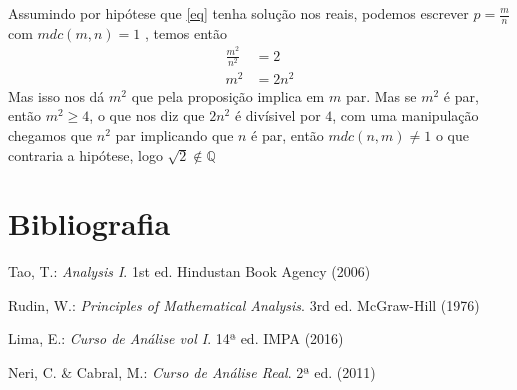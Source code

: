 \documentclass{article}
\newcommand{\QQ}{\mathbb{Q}}
\theoremstyle{plain}
\theoremstyle{remark}
\numberwithin{equation}{section}
\numberwithin{thm}{section}
\numberwithin{defn}{section}
\numberwithin{lemma}{section}
\numberwithin{axm}{section}
\begin{document}
Assumindo por hipótese que \eqref{eq} tenha solução nos reais, podemos escrever \(p = \frac{m}{n}\) com \(mdc(m,n) = 1\) , temos então
\begin{align*}
\frac{m^2}{n^2} &= 2\\
m^2 &= 2n^2
\end{align*}
Mas isso nos dá \(m^2\) que pela proposição implica em \(m\) par. Mas se \(m^2\) é par, então \(m^2 \geq 4\), o que nos diz que \(2n^2\) é divísivel por \(4\), com uma manipulação chegamos que \(n^2\) par implicando que \(n\) é par, então \(mdc(n,m) \neq 1\) o que contraria a hipótese, logo \(\sqrt{2} \notin \QQ\) 


\section*{Bibliografia}
\begin{thebibliography}{1}

Tao, T.: \textit{Analysis I}. 1st ed. Hindustan Book Agency (2006)

Rudin, W.: \textit{Principles of Mathematical Analysis}. 3rd ed. McGraw-Hill (1976)

Lima, E.: \textit{Curso de Análise vol I}. 14ª ed. IMPA (2016)

Neri, C. \& Cabral, M.: \textit{Curso de Análise Real}. 2ª ed. (2011)
\end{thebibliography}
\end{document}
